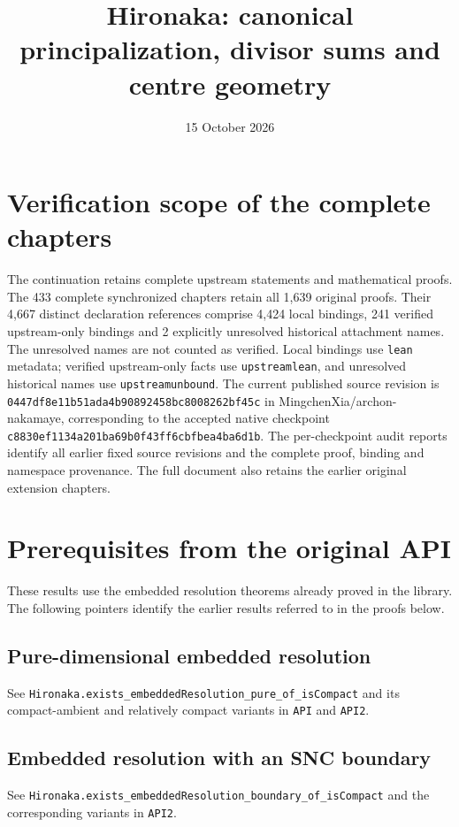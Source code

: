\documentclass[11pt,a4paper]{article}
\title{Hironaka: canonical principalization, divisor sums and centre geometry}
\author{}
\date{15 October 2026}
\theoremstyle{definition}
\providecommand{\href}[2]{#2}
\begin{document}
\maketitle
\section*{Verification scope of the complete chapters}
The continuation retains complete upstream statements and mathematical proofs.
The 433 complete synchronized chapters retain all 1,639 original proofs.
Their 4,667 distinct declaration references comprise 4,424 local
bindings, 241 verified upstream-only bindings and 2 explicitly unresolved historical
attachment names. The unresolved names are not counted as verified.
Local bindings use \texttt{lean} metadata; verified upstream-only facts use
\texttt{upstreamlean}, and unresolved historical names use
\texttt{upstreamunbound}. The current published source revision is
\texttt{0447df8e11b51ada4b90892458bc8008262bf45c} in
\href{https://github.com/MingchenXia/archon-nakamaye}{MingchenXia/archon-nakamaye},
corresponding to the accepted native checkpoint
\texttt{c8830ef1134a201ba69b0f43ff6cbfbea4ba6d1b}.
The per-checkpoint audit reports identify all earlier fixed source revisions
and the complete proof, binding and namespace provenance. The full document
also retains the earlier original extension chapters.
\section{Prerequisites from the original API}
These results use the embedded resolution theorems already proved in the library.
The following pointers identify the earlier results referred to in the proofs below.
\subsection{Pure-dimensional embedded resolution}\label{hir:embedded-resolution-pure-dimensional}
See \texttt{Hironaka.exists\_embeddedResolution\_pure\_of\_isCompact} and its compact-ambient and relatively compact variants in \texttt{API} and \texttt{API2}.
\subsection{Embedded resolution with an SNC boundary}\label{hir:embedded-resolution-boundary}
See \texttt{Hironaka.exists\_embeddedResolution\_boundary\_of\_isCompact} and the corresponding variants in \texttt{API2}.
\end{document}
